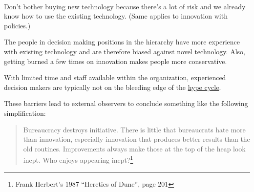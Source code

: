 \ \\

Don't bother buying new technology because there's a lot of risk and we already know how to use the existing technology. (Same applies to innovation with policies.)

The people in decision making positions in the hierarchy have more experience with existing technology and are therefore biased against novel technology. Also, getting burned a few times on innovation makes people more conservative.

With limited time and staff available within the organization, experienced decision makers are typically not on the bleeding edge of the \href{https://en.wikipedia.org/wiki/Gartner_hype_cycle}{hype cycle}.


These barriers lead to external observers to conclude something like the following simplification:
\begin{quote}
Bureaucracy destroys initiative. There is little that bureaucrats hate more than innovation, especially innovation that produces better results than the old routines.
Improvements always make those at the top of the heap look inept. Who enjoys appearing inept?\footnote{Frank Herbert's 1987 ``Heretics of Dune'', page 201}%
\end{quote}

